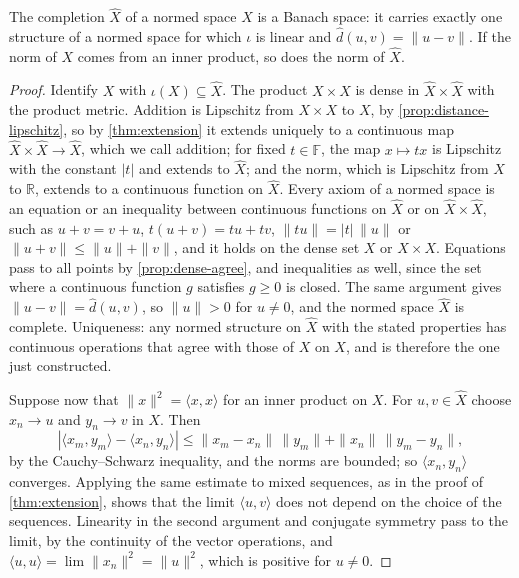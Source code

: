 \begin{proposition}
\label{prop:completion-normed}
The completion $\hat X$ of a normed space $X$ is a Banach space: it carries exactly one structure of a normed space for which $\iota$ is linear and $\hat d(u,v)=\|u-v\|$. If the norm of $X$ comes from an inner product, so does the norm of $\hat X$.
\end{proposition}

\begin{proof}
Identify $X$ with $\iota(X)\subseteq\hat X$. The product $X\times X$ is dense in $\hat X\times\hat X$ with the product metric. Addition is Lipschitz from $X\times X$ to $X$, by \cref{prop:distance-lipschitz}, so by \cref{thm:extension} it extends uniquely to a continuous map $\hat X\times\hat X\to\hat X$, which we call addition; for fixed $t\in\mathbb F$, the map $x\mapsto tx$ is Lipschitz with the constant $|t|$ and extends to $\hat X$; and the norm, which is Lipschitz from $X$ to $\mathbb R$, extends to a continuous function on $\hat X$. Every axiom of a normed space is an equation or an inequality between continuous functions on $\hat X$ or on $\hat X\times\hat X$, such as $u+v=v+u$, $t(u+v)=tu+tv$, $\|tu\|=|t|\,\|u\|$ or $\|u+v\|\le\|u\|+\|v\|$, and it holds on the dense set $X$ or $X\times X$. Equations pass to all points by \cref{prop:dense-agree}, and inequalities as well, since the set where a continuous function $g$ satisfies $g\ge0$ is closed. The same argument gives $\|u-v\|=\hat d(u,v)$, so $\|u\|>0$ for $u\ne0$, and the normed space $\hat X$ is complete. Uniqueness: any normed structure on $\hat X$ with the stated properties has continuous operations that agree with those of $X$ on $X$, and is therefore the one just constructed.

Suppose now that $\|x\|^2=\langle x,x\rangle$ for an inner product on $X$. For $u,v\in\hat X$ choose $x_n\to u$ and $y_n\to v$ in $X$. Then
\[
|\langle x_m,y_m\rangle-\langle x_n,y_n\rangle|\le\|x_m-x_n\|\,\|y_m\|+\|x_n\|\,\|y_m-y_n\| ,
\]
by the Cauchy--Schwarz inequality, and the norms are bounded; so $\langle x_n,y_n\rangle$ converges. Applying the same estimate to mixed sequences, as in the proof of \cref{thm:extension}, shows that the limit $\langle u,v\rangle$ does not depend on the choice of the sequences. Linearity in the second argument and conjugate symmetry pass to the limit, by the continuity of the vector operations, and $\langle u,u\rangle=\lim\|x_n\|^2=\|u\|^2$, which is positive for $u\ne0$.
\end{proof}

